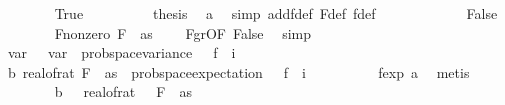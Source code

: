 \begin{isabellebody}
\ \ \ \ \ \ \isamarkupfalse%
\ True\isanewline
\ \ \ \ \ \ \isamarkupfalse%
\ \isamarkupfalse%
\ {\isacharquery}{\kern0pt}thesis\ \isamarkupfalse%
\ a\ \isamarkupfalse%
\ {\isacharparenleft}{\kern0pt}simp\ add{\isacharcolon}{\kern0pt}f{}{\isacharunderscore}{\kern0pt}def\ F{\isacharunderscore}{\kern0pt}def\ f{}{\isacharunderscore}{\kern0pt}def{\isacharparenright}{\kern0pt}\isanewline
\ \ \ \ \isamarkupfalse%
\isanewline
\ \ \ \ \ \ \isamarkupfalse%
\ False\isanewline
\ \ \ \ \ \ \isamarkupfalse%
\ F{\isacharunderscore}{\kern0pt}{}{\isacharunderscore}{\kern0pt}nonzero{\isacharcolon}{\kern0pt}\ {\isachardoublequoteopen}F\ {}\ as\ {\isachargreater}{\kern0pt}\ {}{\isachardoublequoteclose}\ \isamarkupfalse%
\ F{\isacharunderscore}{\kern0pt}gr{\isacharunderscore}{\kern0pt}{}{\isacharbrackleft}{\kern0pt}OF\ False{\isacharbrackright}{\kern0pt}\ \isamarkupfalse%
\ simp\isanewline
\isanewline
\ \ \ \ \ \ \isamarkupfalse%
\ var\ \ \ {\isachardoublequoteopen}var\ {\isacharequal}{\kern0pt}\ prob{\isacharunderscore}{\kern0pt}space{\isachardot}{\kern0pt}variance\ {\isasymOmega}\ {\isacharparenleft}{\kern0pt}{\isasymlambda}{\isasymomega}{\isachardot}{\kern0pt}\ f{}\ {\isasymomega}\ i{\isacharparenright}{\kern0pt}{\isachardoublequoteclose}\isanewline
\ \ \ \ \ \ \isamarkupfalse%
\ b{\isacharunderscore}{\kern0pt}{}{\isacharcolon}{\kern0pt}\ {\isachardoublequoteopen}real{\isacharunderscore}{\kern0pt}of{\isacharunderscore}{\kern0pt}rat\ {\isacharparenleft}{\kern0pt}F\ {}\ as{\isacharparenright}{\kern0pt}\ {\isacharequal}{\kern0pt}\ prob{\isacharunderscore}{\kern0pt}space{\isachardot}{\kern0pt}expectation\ {\isasymOmega}\ {\isacharparenleft}{\kern0pt}{\isasymlambda}{\isasymomega}{\isachardot}{\kern0pt}\ f{}\ {\isasymomega}\ i{\isacharparenright}{\kern0pt}{\isachardoublequoteclose}\isanewline
\ \ \ \ \ \ \ \ \isamarkupfalse%
\ f{}{\isacharunderscore}{\kern0pt}exp{\isacharprime}{\kern0pt}{\isacharprime}{\kern0pt}\ a\ \isamarkupfalse%
\ metis\isanewline
\ \ \ \ \ \ \isamarkupfalse%
\ b{\isacharunderscore}{\kern0pt}{}{\isacharcolon}{\kern0pt}\ {\isachardoublequoteopen}{}\ {\isacharless}{\kern0pt}\ real{\isacharunderscore}{\kern0pt}of{\isacharunderscore}{\kern0pt}rat\ {\isacharparenleft}{\kern0pt}{\isasymdelta}\ {\isacharasterisk}{\kern0pt}\ F\ {}\ as{\isacharparenright}{\kern0pt}{\isachardoublequoteclose}\isanewline

\end{isabellebody}

